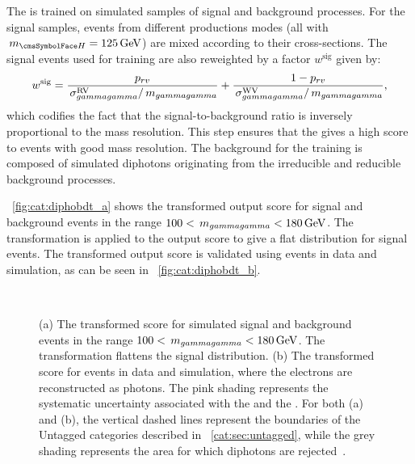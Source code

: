 The \DiPhoBdt is trained on simulated samples of signal and background processes. For the signal samples, events from different productions modes (all with $\mH=125\GeV$) are mixed according to their \SM cross-sections. The signal events used for training are also reweighted by a factor $w^{\text{sig}}$ given by: 
\begin{equation}
w^{\text{sig}}= \frac{p_{rv}}{\,\sigma^\text{RV}_{gammagamma}/\,m_{gammagamma}}+\frac{1-p_{rv}}{\,\sigma^\text{WV}_{gammagamma}/\,m_{gammagamma}},
\end{equation} 
which codifies the fact that the signal-to-background ratio is inversely proportional to the mass resolution. This step ensures that the \DiPhoBdt gives a high score to events with good mass resolution.
The background for the training is composed of simulated diphotons originating from the irreducible and reducible \SM background processes. 

\Fig~\ref{fig:cat:diphobdt_a} shows the transformed \DiPhoBdt output score for signal and background events in the range $100 < \mgg < 180\GeV$. The transformation is applied to the \DiPhoBdt output score to give a flat distribution for signal events. The transformed \DiPhoBdt output score is validated using \Zee events in data and simulation, as can be seen in \Fig~\ref{fig:cat:diphobdt_b}.
\begin{figure}[hpt]
\centering
\\
\caption[(a) The transformed \DiPhoBdt score for simulated signal and background events in the range $100 < \mgg < 180\GeV$. The transformation flattens the signal distribution. (b) The transformed \DiPhoBdt score for \Zee events in data and simulation, where the electrons are reconstructed as photons. The pink shading represents the systematic uncertainty associated with the \PhoIdBdt and the \PhoEnergyBdt. For both (a) and (b), the vertical dashed lines represent the boundaries of the Untagged categories described in \Sec~\ref{cat:sec:untagged}, while the grey shading represents the area for which diphotons are rejected\quad\cite{CMS-PAS-HIG-16-020}.]{(a) The transformed \DiPhoBdt score for simulated signal and background events in the range $100 < \mgg < 180\GeV$. The transformation flattens the signal distribution. (b) The transformed \DiPhoBdt score for \Zee events in data and simulation, where the electrons are reconstructed as photons. The pink shading represents the systematic uncertainty associated with the \PhoIdBdt and the \PhoEnergyBdt. For both (a) and (b), the vertical dashed lines represent the boundaries of the Untagged categories described in \Sec~\ref{cat:sec:untagged}, while the grey shading represents the area for which diphotons are rejected~\cite{CMS-PAS-HIG-16-020}.} 
\label{fig:cat:diphobdt}
\end{figure}

